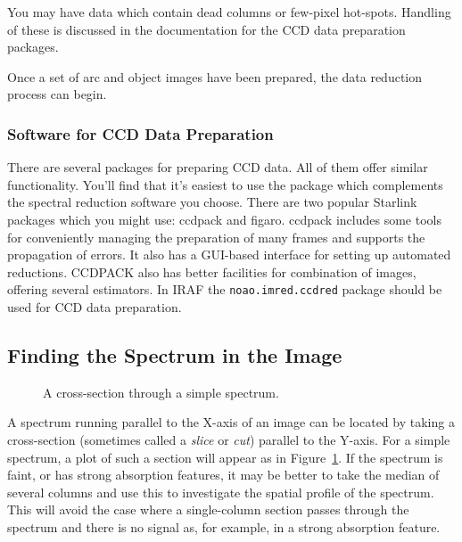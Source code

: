 \documentclass[twoside,11pt]{article}
\newcommand{\htmlref}[2]{#1}
\newcommand{\xref}[3]{#1}
\newcommand{\xlabel}[1]{}
\newcommand{\mlabel}[1]{\xlabel{#1}\label{#1}}
\newcommand{\scspec}[2]{#1}
\newcommand{\scspec}[2]{#2}
\begin{document}
You may have data which contain \htmlref{dead columns}{gl_dead_column} or
few-pixel \htmlref{hot-spots}{gl_hotspot}.
Handling of these is discussed in the documentation for the CCD data
preparation packages.

Once a set of arc and object images have been prepared, the data
reduction process can begin.


\subsubsection{Software for CCD Data Preparation}

There are several packages for preparing \htmlref{CCD}{gl_ccd} data.
All of them offer similar functionality.
You'll find that it's easiest to use the package which complements
the spectral reduction software you choose.
There are two popular Starlink packages which you might use:
\xref{{\sc ccdpack}}{sun139}{} and \xref{{\sc figaro}}{sun86}{}\@.
{\sc ccdpack} includes some tools for conveniently managing the preparation
of many frames and supports the propagation of errors.
It also has a GUI-based interface for setting up automated reductions.
CCDPACK also has better facilities for combination of images, offering
several estimators.
In IRAF the {\tt noao.imred.ccdred} package should be used for CCD
data preparation.


\subsection{\mlabel{finding_spectrum}Finding the Spectrum in the Image}

\begin{figure}
\begin{center}
  \scspec{\leavevmode\epsfysize=105mm\epsfbox{sc7_02.eps}}
          {\leavevmode\epsfysize=136mm}

  \parbox{140mm}{
    \caption{A cross-section through a simple spectrum.}
    \label{fi_spectrum_locate}
  }
\end{center}
\end{figure}

A spectrum running parallel to the X-axis of an image can
be located by taking a cross-section (sometimes called a {\em slice} or {\em
cut}) parallel to the Y-axis.  For a simple spectrum, a plot of such a
section will appear as in \scspec{Figure~\ref{fi_spectrum_locate}}{the figure
above}.
If the spectrum is
faint, or has strong absorption features, it may be better to take the
median of several columns and use this to investigate the spatial profile
of the spectrum.  This will avoid the case where a single-column section
passes through the spectrum and there is no signal as, for example, in a
strong absorption feature.
\end{document}
